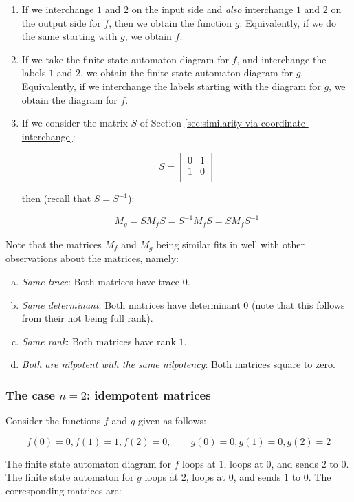 \documentclass[10pt]{amsart}
\begin{document}
\begin{enumerate}
\item If we interchange $1$ and $2$ on the input side and {\em also}
  interchange $1$ and $2$ on the output side for $f$, then we obtain
  the function $g$. Equivalently, if we do the same starting with $g$,
  we obtain $f$.
\item If we take the finite state automaton diagram for $f$, and
  interchange the labels $1$ and $2$, we obtain the finite state
  automaton diagram for $g$. Equivalently, if we interchange the labels
  starting with the diagram for $g$, we obtain the diagram for $f$.
\item If we consider the matrix $S$ of Section
  \ref{sec:similarity-via-coordinate-interchange}:
  
  $$S = \left[\begin{matrix} 0 & 1 \\ 1 & 0 \\\end{matrix}\right]$$

then (recall that $S = S^{-1}$):

$$M_g = SM_fS = S^{-1}M_fS = SM_fS^{-1}$$
\end{enumerate}

Note that the matrices $M_f$ and $M_g$ being similar fits in well with other
observations about the matrices, namely:

\begin{enumerate}[(a)]
\item {\em Same trace}: Both matrices have trace $0$.
\item {\em Same determinant}: Both matrices have determinant $0$ (note
  that this follows from their not being full rank).
\item {\em Same rank}: Both matrices have rank $1$.
\item {\em Both are nilpotent with the same nilpotency}: Both matrices
  square to zero.
\end{enumerate}

\subsubsection{The case $n = 2$: idempotent matrices}\label{sec:idempotent2by2}

Consider the functions $f$ and $g$ given as follows:

$$f(0) = 0, f(1) = 1, f(2) = 0, \qquad g(0) = 0, g(1) = 0, g(2) = 2$$

The finite state automaton diagram for $f$ loops at $1$, loops at $0$,
and sends $2$ to $0$. The finite state automaton for $g$ loops at $2$,
loops at $0$, and sends $1$ to $0$. The corresponding matrices are:
\end{document}
